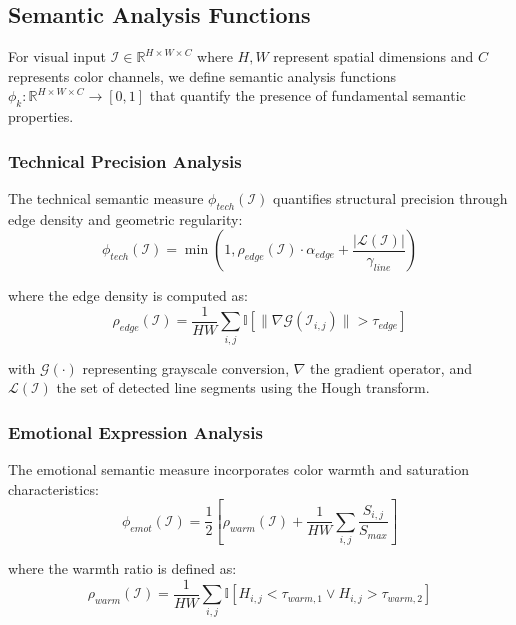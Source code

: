 \subsection{Semantic Analysis Functions}

For visual input $\mathcal{I} \in \mathbb{R}^{H \times W \times C}$ where $H, W$ represent spatial dimensions and $C$ represents color channels, we define semantic analysis functions $\phi_k: \mathbb{R}^{H \times W \times C} \to [0,1]$ that quantify the presence of fundamental semantic properties.

\subsubsection{Technical Precision Analysis}

The technical semantic measure $\phi_{tech}(\mathcal{I})$ quantifies structural precision through edge density and geometric regularity:
\begin{equation}
\phi_{tech}(\mathcal{I}) = \min\left(1, \rho_{edge}(\mathcal{I}) \cdot \alpha_{edge} + \frac{|\mathcal{L}(\mathcal{I})|}{\gamma_{line}}\right)
\label{eq:technical-measure}
\end{equation}

where the edge density is computed as:
\begin{equation}
\rho_{edge}(\mathcal{I}) = \frac{1}{HW} \sum_{i,j} \mathbb{I}[\|\nabla \mathcal{G}(\mathcal{I}_{i,j})\| > \tau_{edge}]
\label{eq:edge-density}
\end{equation}

with $\mathcal{G}(\cdot)$ representing grayscale conversion, $\nabla$ the gradient operator, and $\mathcal{L}(\mathcal{I})$ the set of detected line segments using the Hough transform.

\subsubsection{Emotional Expression Analysis}

The emotional semantic measure incorporates color warmth and saturation characteristics:
\begin{equation}
\phi_{emot}(\mathcal{I}) = \frac{1}{2}\left[\rho_{warm}(\mathcal{I}) + \frac{1}{HW} \sum_{i,j} \frac{S_{i,j}}{S_{max}}\right]
\label{eq:emotional-measure}
\end{equation}

where the warmth ratio is defined as:
\begin{equation}
\rho_{warm}(\mathcal{I}) = \frac{1}{HW} \sum_{i,j} \mathbb{I}[H_{i,j} < \tau_{warm,1} \vee H_{i,j} > \tau_{warm,2}]
\label{eq:warmth-ratio}
\end{equation}

